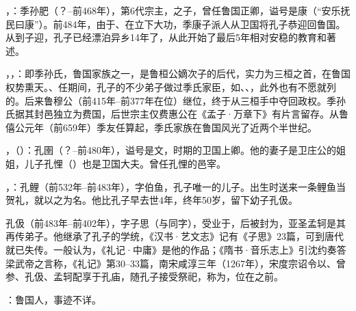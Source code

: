 ，：季孙肥（？--前468年），第6代宗主，之子，曾任鲁国正卿，谥号是康（“安乐抚民曰康”）。前484年，由于、在立下大功，季康子派人从卫国将孔子恭迎回鲁国。从到子迎，孔子已经漂泊异乡14年了，从此开始了最后5年相对安稳的教育和著述。

，，：即季孙氏，鲁国家族之一，是鲁桓公嫡次子的后代，实力为三桓之首，在鲁国权势熏天。、任期间，孔子的不少弟子做过季氏家臣，如、、，此外也有不愿就列的。后来鲁穆公（前415年--前377年在位）继位，终于从三桓手中夺回政权。季孙氏据其封邑独立为费国，后世宗主仅费惠公在《孟子·万章下》有片言留存。从鲁僖公元年（前659年）季友任算起，季氏家族在鲁国风光了近两个半世纪。

，（）：孔圉（？--前480年），谥号是文，时期的卫国上卿。他的妻子是卫庄公的姐姐，儿子孔悝（）也是卫国大夫。曾任孔悝的邑宰。

，：孔鲤（前532年--前483年），字伯鱼，孔子唯一的儿子。出生时送来一条鲤鱼当贺礼，就以之为名。他比孔子早去世4年，终年50岁，留下幼子孔伋。

孔伋（前483年--前402年），字子思（与同字），受业于，后被封为，亚圣孟轲是其再传弟子。他继承了孔子的学统，《汉书·艺文志》记有《子思》23篇，可到唐代就已失传。一般认为，《礼记·中庸》是他的作品；《隋书·音乐志上》引沈约奏答梁武帝之言称，《礼记》第30--33篇，南宋咸淳三年（1267年），宋度宗诏令以、曾参、孔伋、孟轲配享于孔庙，随孔子接受祭祀，称为，位在之前。

：鲁国人，事迹不详。%

